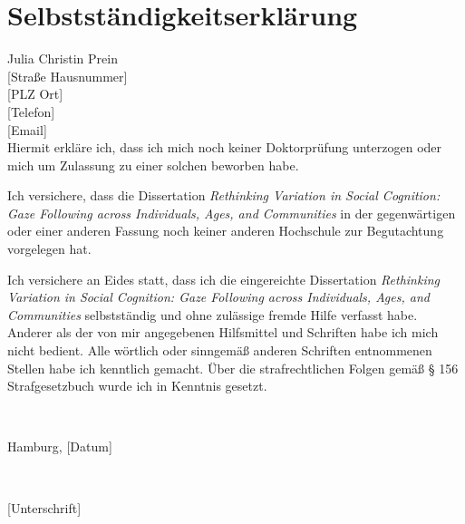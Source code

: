\documentclass[
]{scrbook}
\begin{document}


\newpage

\chapter{Selbstständigkeitserklärung}\label{selbststaendigkeit}

Julia Christin Prein\\
{[}Straße Hausnummer{]}\\
{[}PLZ Ort{]}\\
{[}Telefon{]}\\
{[}Email{]}\\

Hiermit erkläre ich, dass ich mich noch keiner Doktorprüfung unterzogen oder mich um Zulassung zu einer solchen beworben habe.

Ich versichere, dass die Dissertation \emph{Rethinking Variation in Social Cognition: Gaze Following across Individuals, Ages, and Communities} in der gegenwärtigen oder einer anderen Fassung noch keiner anderen Hochschule zur Begutachtung vorgelegen hat.

Ich versichere an Eides statt, dass ich die eingereichte Dissertation \emph{Rethinking Variation in Social Cognition: Gaze Following across Individuals, Ages, and Communities} selbstständig und ohne zulässige fremde Hilfe verfasst habe. Anderer als der von mir angegebenen Hilfsmittel und Schriften habe ich mich nicht bedient. Alle wörtlich oder sinngemäß anderen Schriften entnommenen Stellen habe ich kenntlich gemacht. Über die strafrechtlichen Folgen gemäß § 156 Strafgesetzbuch wurde ich in Kenntnis gesetzt.

~

Hamburg, {[}Datum{]}

~

{[}Unterschrift{]}
\end{document}
